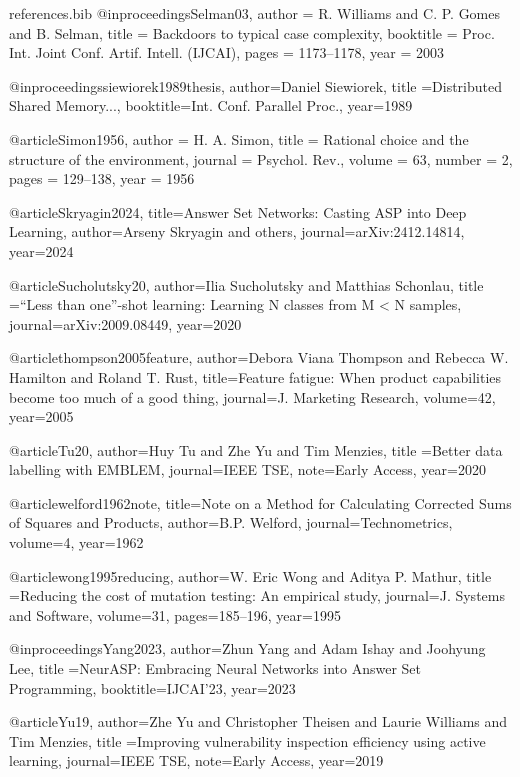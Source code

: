 \documentclass[runningheads]{llncs}
\begin{document}
\begin{filecontents}{references.bib}
@inproceedings{Selman03,
  author    = {R. Williams and C. P. Gomes and B. Selman},
  title     = {Backdoors to typical case complexity},
  booktitle = {Proc. Int. Joint Conf. Artif. Intell. (IJCAI)},
  pages     = {1173--1178},
  year      = {2003}
}

@inproceedings{siewiorek1989thesis,
  author={Daniel Siewiorek},
  title ={Distributed Shared Memory...},
  booktitle={Int. Conf. Parallel Proc.}, year={1989}
}

@article{Simon1956,
  author  = {H. A. Simon},
  title   = {Rational choice and the structure of the environment},
  journal = {Psychol. Rev.},
  volume  = {63},
  number  = {2},
  pages   = {129--138},
  year    = {1956}
}

@article{Skryagin2024,
  title={Answer Set Networks: Casting ASP into Deep Learning},
  author={Arseny Skryagin and others}, journal={arXiv:2412.14814}, year={2024}
}

@article{Sucholutsky20,
  author={Ilia Sucholutsky and Matthias Schonlau},
  title ={``Less than one''-shot learning: Learning N classes from M < N samples},
  journal={arXiv:2009.08449}, year={2020}
}

@article{thompson2005feature,
  author={Debora Viana Thompson and Rebecca W. Hamilton and Roland T. Rust},
  title={Feature fatigue: When product capabilities become too much of a good thing},
  journal={J. Marketing Research}, volume={42}, year={2005}
}

@article{Tu20,
  author={Huy Tu and Zhe Yu and Tim Menzies},
  title ={Better data labelling with EMBLEM},
  journal={IEEE TSE}, note={Early Access}, year={2020}
}

@article{welford1962note,
  title={Note on a Method for Calculating Corrected Sums of Squares and Products},
  author={B.P. Welford}, journal={Technometrics}, volume={4}, year={1962}
}

@article{wong1995reducing,
  author={W. Eric Wong and Aditya P. Mathur},
  title ={Reducing the cost of mutation testing: An empirical study},
  journal={J. Systems and Software}, volume={31}, pages={185--196}, year={1995}
}

@inproceedings{Yang2023,
  author={Zhun Yang and Adam Ishay and Joohyung Lee},
  title ={NeurASP: Embracing Neural Networks into Answer Set Programming},
  booktitle={IJCAI'23}, year={2023}
}

@article{Yu19,
  author={Zhe Yu and Christopher Theisen and Laurie Williams and Tim Menzies},
  title ={Improving vulnerability inspection efficiency using active learning},
  journal={IEEE TSE}, note={Early Access}, year={2019}
}


\end{filecontents}
\end{document}
